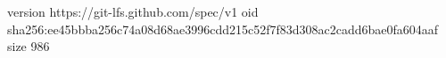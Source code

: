 version https://git-lfs.github.com/spec/v1
oid sha256:ee45bbba256c74a08d68ae3996cdd215c52f7f83d308ac2cadd6bae0fa604aaf
size 986
